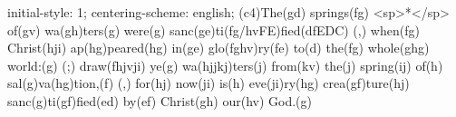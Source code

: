 initial-style: 1;
centering-scheme: english;
(c4)The(gd) springs(fg) <sp>*</sp> of(gv) wa(gh)ters(g) were(g) sanc(ge)ti(fg/hvFE)fied(dfEDC) (,) when(fg) Christ(hji) ap(hg)peared(hg) in(ge) glo(fghv)ry(fe) to(d) the(fg) whole(ghg) world:(g) (;) draw(fhjvji) ye(g) wa(hjjkj)ters(j) from(kv) the(j) spring(ij) of(h) sal(g)va(hg)tion,(f) (,) for(hj) now(ji) is(h) eve(ji)ry(hg) crea(gf)ture(hj) sanc(g)ti(gf)fied(ed) by(ef) Christ(gh) our(hv) God.(g)
